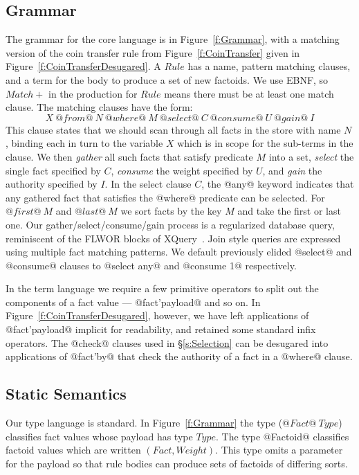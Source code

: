 \subsection{Grammar}
The grammar for the core language is in Figure~\ref{f:Grammar}, with a matching version of the coin transfer rule from Figure~\ref{f:CoinTransfer} given in Figure~\ref{f:CoinTransferDesugared}.
A $Rule$ has a name, pattern matching clauses, and a term for the body to produce a set of new factoids. We use EBNF, so $Match+$ in the production for $Rule$ means there must be at least one match clause. The matching clauses have the form:
$$
X~ @from@~ N~ @where@~ M~ @select@~ C~ @consume@~ U~ @gain@~ I
$$
This clause states that we should scan through all facts in the store with name $N$, binding each in turn to the variable $X$ which is in scope for the sub-terms in the clause. We then \emph{gather} all such facts that satisfy predicate $M$ into a set, \emph{select} the single fact specified by $C$, \emph{consume} the weight specified by $U$, and \emph{gain} the authority specified by $I$. In the select clause $C$, the @any@ keyword indicates that any gathered fact that satisfies the @where@ predicate can be selected. For $@first@~ M$ and $@last@~ M$ we sort facts by the key $M$ and take the first or last one. Our gather/select/consume/gain process is a regularized database query, reminiscent of the FLWOR blocks of XQuery~\cite{Boag2002:XQuery}. Join style queries are expressed using multiple fact matching patterns. We default previously elided @select@ and @consume@ clauses to @select any@ and @consume 1@ respectively.

In the term language we require a few primitive operators to split out the components of a fact value --- @fact'payload@ and so on. In Figure~\ref{f:CoinTransferDesugared}, however, we have left applications of @fact'payload@ implicit for readability, and retained some standard infix operators. The @check@ clauses used in \S\ref{s:Selection} can be desugared into applications of @fact'by@ that check the authority of a fact in a @where@ clause.


\eject{}
\subsection{Static Semantics}
Our type language is standard. In Figure~\ref{f:Grammar} the type ($@Fact@~ Type$) classifies fact values whose payload has type $Type$. The type @Factoid@ classifies factoid values which are written $(Fact, Weight)$. This type omits a parameter for the payload so that rule bodies can produce sets of factoids of differing sorts.

